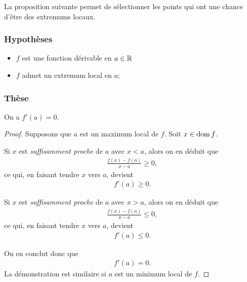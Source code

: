 \documentclass[main.tex]{subfiles}
\begin{document}
La proposition suivante permet de sélectionner les points qui ont une chance d'être des extremums locaux.

\begin{proposition}

    \subsubsection{Hypothèses}

    \begin{itemize}
        \item $f$ est une fonction dérivable en $a \in \mathbb{R}$
        \item $f$ admet un extremum local en $a$;
    \end{itemize}

    \subsubsection{Thèse}

    On a $f'(a) = 0$.

    \begin{plot}{0.3}{-6}{-6}{6}{6}
        \renewcommand{\f}{-1/5*(\x)^2 + 2}
        \renewcommand{\der}{-2/5*(\x)}
        \plotfunction{-6:6}{\f}
        \drawtangent{\f}{\der}{0}{-2:2}
    \end{plot}
\end{proposition}
\begin{proof}
    Supposons que $a$ est un maximum local de $f$.
    Soit $x \in \operatorname{dom} f$.

    \begin{multicols}{2}
        Si $x$ est \emph{suffisamment proche} de $a$ avec $x < a$,
        alors on en déduit que
        \begin{align}
            \frac{f(x) - f(a)}{x-a} \ge 0,
        \end{align}
        ce qui, en faisant tendre $x$ vers $a$, devient
        \begin{align}
            f'(a) \ge 0.
        \end{align}

        Si $x$ est \emph{suffisamment proche} de $a$ avec $x > a$,
        alors on en déduit que
        \begin{align}
            \frac{f(x) - f(a)}{x-a} \le 0,
        \end{align}
        ce qui, en faisant tendre $x$ vers $a$, devient
        \begin{align}
            f'(a) \le 0.
        \end{align}
    \end{multicols}

    On en conclut donc que
    \begin{align}
        f'(a) = 0.
    \end{align}
    La démonstration est similaire si $a$ est un minimum local de $f$.
\end{proof}
\end{document}
